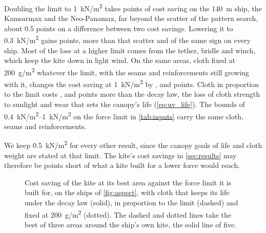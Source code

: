 Doubling the limit to \SI{1}{kN/m^2} takes  points of cost saving on the \SI{140}{m} ship, the Kamsarmax and the Neo-Panamax, far beyond the scatter of the pattern search, about 0.5 points on a difference between two cost savings. Lowering it to \SI{0.3}{kN/m^2} gains  points, more than that scatter and of the same sign on every ship. Most of the loss at a higher limit comes from the tether, bridle and winch, which keep the kite down in light wind. On the same areas, cloth fixed at \SI{200}{g/m^2} whatever the limit, with the seams and reinforcements still growing with it, changes the cost saving at \SI{1}{kN/m^2} by ,  and  points. Cloth in proportion to the limit costs ,  and  points more than the decay law, the loss of cloth strength to sunlight and wear that sets the canopy's life (\cref{eq:uv_life}).  The bounds of \SIrange{0.4}{1}{kN/m^2} on the force limit in \cref{tab:inputs} carry the same cloth, seams and reinforcements.

We keep \SI{0.5}{kN/m^2} for every other result, since the canopy goals of life and cloth weight are stated at that limit. The kite's cost savings in \cref{sec:results} may therefore be  points short of what a kite built for a lower force would reach. 

\begin{figure}[tbp]
\centering
{}
\caption{Cost saving of the kite at its best area against the force limit it is built for, on the ships of \cref{fig:aspect}, with cloth that keeps its life under the decay law (solid), in proportion to the limit (dashed) and fixed at \SI{200}{g/m^2} (dotted). The dashed and dotted lines take the best of three areas around the ship's own kite, the solid line of five.}
\label{fig:force_rating}
\end{figure}
